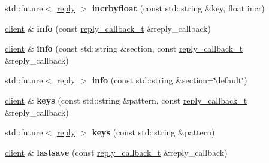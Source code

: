 \begin{DoxyCompactItemize}
std\+::future$<$ \hyperlink{classcpp__redis_1_1reply}{reply} $>$ {\bfseries incrbyfloat} (const std\+::string \&key, float incr)
\item 
\mbox{\label{classcpp__redis_1_1client_aaa98ba6f8936eaa013ca0df553199f85}} 
\hyperlink{classcpp__redis_1_1client}{client} \& {\bfseries info} (const \hyperlink{classcpp__redis_1_1client_a061a1140d36d2eaeda82b09a0bb3f9f2}{reply\+\_\+callback\+\_\+t} \&reply\+\_\+callback)
\item 
\mbox{\label{classcpp__redis_1_1client_af276159a3938c97e5318dff39a9084ae}} 
\hyperlink{classcpp__redis_1_1client}{client} \& {\bfseries info} (const std\+::string \&section, const \hyperlink{classcpp__redis_1_1client_a061a1140d36d2eaeda82b09a0bb3f9f2}{reply\+\_\+callback\+\_\+t} \&reply\+\_\+callback)
\item 
\mbox{\label{classcpp__redis_1_1client_aa0186723d51c8b3c92979537e8ad43b9}} 
std\+::future$<$ \hyperlink{classcpp__redis_1_1reply}{reply} $>$ {\bfseries info} (const std\+::string \&section=\char`\"{}default\char`\"{})
\item 
\mbox{\label{classcpp__redis_1_1client_acb7845a206b2321e6919c2f38282c322}} 
\hyperlink{classcpp__redis_1_1client}{client} \& {\bfseries keys} (const std\+::string \&pattern, const \hyperlink{classcpp__redis_1_1client_a061a1140d36d2eaeda82b09a0bb3f9f2}{reply\+\_\+callback\+\_\+t} \&reply\+\_\+callback)
\item 
\mbox{\label{classcpp__redis_1_1client_a1c0804cab9251acde742e725d0af6cbf}} 
std\+::future$<$ \hyperlink{classcpp__redis_1_1reply}{reply} $>$ {\bfseries keys} (const std\+::string \&pattern)
\item 
\mbox{\label{classcpp__redis_1_1client_a3b25eaf2691051156748abb69e1b0317}} 
\hyperlink{classcpp__redis_1_1client}{client} \& {\bfseries lastsave} (const \hyperlink{classcpp__redis_1_1client_a061a1140d36d2eaeda82b09a0bb3f9f2}{reply\+\_\+callback\+\_\+t} \&reply\+\_\+callback)
\item 
\mbox{\label{classcpp__redis_1_1client_a6b550a4ecf6eb33abffd664c3124b4f9}} 

\end{DoxyCompactItemize}
